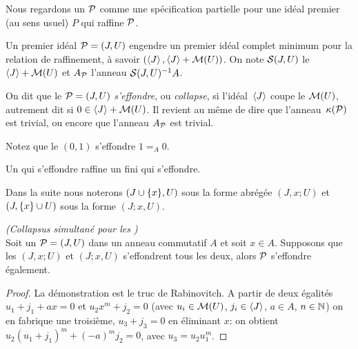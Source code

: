 Nous regardons un \proi ${\cal P}$  comme une 
spécification partielle pour une idéal premier
(au sens usuel)  $P$ qui raffine 
${\cal P}$.  

Un premier idéal ${\cal P}=(J,U)$ engendre un premier idéal complet minimum pour la relation de raffinement, à savoir $(\left\langle{J}\right\rangle,\left\langle{J}\right\rangle+{\cal M}(U))$. 
On note ${\cal S}(J,U)$ le \mo \hbox{$\left\langle{J}\right\rangle+{\cal M}(U)$} et $A_{\cal P}$ l'anneau ${\cal S}(J,U)^{-1}A$.


\begin{definition} \label{defiproicollaps}{\rm
On dit que le \proi ${\cal P}=(J,U)$ \emph{s'effondre}, ou \emph{collapse}, si l'idéal~$\left\langle{J}\right\rangle$ coupe le \mo ${\cal M}(U)$, autrement dit si $0\in \left\langle{J}\right\rangle+{\cal M}(U)$}. Il revient au même de dire que l'anneau~$\kappa({\cal P})$ est trivial,
ou encore que l'anneau $A_{\cal P}$ est trivial.
\end{definition}

Notez que le \proi $(0,1)$ s'effondre \ssi $1=_A0$.

\begin{lemma} \label{lemfinicol}
Un \proi qui s'effondre raffine un \proi fini qui s'effondre. 
\end{lemma}


Dans la suite nous noterons $(J\cup\{x\} , U)$ sous la forme abrégée $(J,x;U)$ et $(J, \{x\} \cup U)$ sous la forme $(J;x,U)$.

\begin{theorem} 
\label{ThColSim0}{\em (Collapsus simultané pour les \prois)}\\
Soit un  \proi ${\cal P}=(J,U)$ dans un anneau commutatif $A$
et soit $x\in A$. Supposons que les \prois 
$(J,x;U)$ et $(J;x,U)$ 
s'effondrent tous les deux, alors ${\cal P}$ s'effondre également.
\end{theorem}
\begin{proof}
La démonstration est le truc de Rabinovitch. A partir de deux 
égalités
$u_1+j_1+ax=0$ et $u_2x^m+j_2=0$ (avec $u_i\in {\cal M}(U)$, $j_i\in \left\langle{J}\right\rangle$, 
$a\in A$,
$n\in\mathbb{N}$) on en fabrique une troisième, $u_3+j_3=0$ en éliminant $x$:
on obtient $u_2(u_1+j_1)^m+(-a)^mj_2=0$, avec $u_3=u_2u_1^m$. 
\end{proof}

